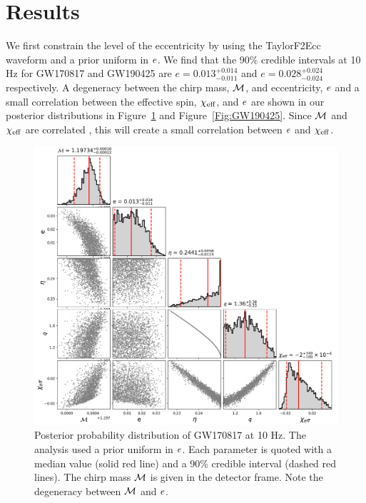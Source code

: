 \section{Results}
\label{sec:pe-Results}
We first constrain the level of the eccentricity by using the TaylorF2Ecc waveform and a prior uniform in $e$. We find that the 90\% credible intervals at 10 Hz for GW170817 and GW190425 are $e = 0.013^{+0.014}_{-0.011}$ and $e = 0.028^{+0.024}_{-0.024}$ respectively. A degeneracy between the chirp mass, $\mathcal{M}$, and eccentricity, $e$ and a small correlation between the effective spin, $\chi_{\mathrm{eff}}$, and $e$ are shown in our posterior distributions in Figure~\ref{Fig:GW170817} and Figure~\ref{Fig:GW190425}. Since $\mathcal{M}$ and $\chi_{\mathrm{eff}}$ are correlated \cite{Baird:2012cu,Safarzadeh:2020mlb}, this will create a small correlation between $e$ and $\chi_{\mathrm{eff}}$.

\begin{figure}
    \includegraphics[width=\textwidth]{Figures/bns-pe/GW170817-e10.png}
    \caption{Posterior probability distribution of GW170817 at 10 Hz. The analysis used a prior uniform in $e$. Each parameter is quoted with a median value (solid red line) and a 90\% credible interval (dashed red lines). The chirp mass $\mathcal{M}$ is given in the detector frame. Note the degeneracy between $\mathcal{M}$ and $e$.}
\label{Fig:GW170817}
\end{figure}

